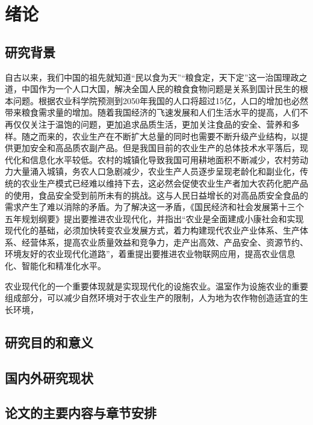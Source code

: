 

\chapter{绪论}
\label{chapter:Introduction}

\section{研究背景}
自古以来，我们中国的祖先就知道“民以食为天”“粮食定，天下定”这一治国理政之道\supercite{ChenYunWenXuan}，中国作为一个人口大国，解决全国人民的粮食食物问题是关系到国计民生的根本问题。根据农业科学院预测到2050年我国的人口将超过15亿，人口的增加也必然带来粮食需求量的增加。随着我国经济的飞速发展和人们生活水平的提高，人们不再仅仅关注于温饱的问题，更加追求品质生活，更加关注食品的安全、营养和多样\supercite{FengZhiming2007,ZhaoQiguo2011}。随之而来的，农业生产在不断扩大总量的同时也需要不断升级产业结构，以提供更加安全和高品质农副产品。但是我国目前的农业生产的总体技术水平落后，现代化和信息化水平较低。农村的城镇化导致我国可用耕地面积不断减少，农村劳动力大量涌入城镇\supercite{YuJunli2001}，务农人口急剧减少，农业生产人员逐步呈现老龄化和副业化\supercite{LuoChaobin2005}，传统的农业生产模式已经难以维持下去，这必然会促使农业生产者加大农药化肥产品的使用，食品安全受到前所未有的挑战。这与人民日益增长的对高品质安全食品的需求产生了难以消除的矛盾。为了解决这一矛盾，《国民经济和社会发展第十三个五年规划纲要》提出要推进农业现代化，并指出“农业是全面建成小康社会和实现现代化的基础，必须加快转变农业发展方式，着力构建现代农业产业体系、生产体系、经营体系，提高农业质量效益和竞争力，走产出高效、产品安全、资源节约、环境友好的农业现代化道路”，着重提出要推进农业物联网应用，提高农业信息化、智能化和精准化水平。

农业现代化的一个重要体现就是实现现代化的设施农业。温室作为设施农业的重要组成部分，可以减少自然环境对于农业生产的限制，人为地为农作物创造适宜的生长环境，
\section{研究目的和意义}

\section{国内外研究现状}

\section{论文的主要内容与章节安排}
